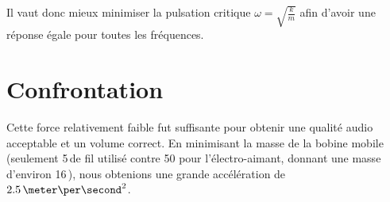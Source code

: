 Il vaut donc mieux minimiser la pulsation critique $\omega = \sqrt{\frac{k}{m}}$ afin d’avoir une réponse égale pour toutes les fréquences.

\section{Confrontation}
Cette force relativement faible fut suffisante pour obtenir une qualité audio acceptable et un volume correct. 
En minimisant la masse de la bobine mobile (seulement 5\,\meter de fil utilisé contre 50 pour l'électro-aimant, 
donnant une masse d'environ 16\,\gram), nous obtenions une grande accélération de $2.5\,\meter\per\second^2$. 
